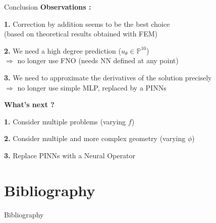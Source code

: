 \documentclass[compress,10pt,xcolor={table,dvipsnames},t]{beamer}
\newcommand{\refappendix}[1]{\tikz[baseline=(char.base)]{\node[framednumber] (char) {\hyperref[#1]{\small \textcolor{white}{Appendix \ref*{#1}}}};}}
\begin{document}
	\begin{frame}[label={lastslide}]{Conclusion}
		\textbf{Observations :}
		
		\textbf{1.} Correction by addition seems to be the best choice \\
		(based on theoretical results obtained with FEM)
		
		\textbf{2.} We need a high degree prediction ($u_\theta\in\mathbb{P}^{10}$) \\
		$\Rightarrow$ no longer use FNO (needs NN defined at any point)
		
		\textbf{3.} We need to approximate the derivatives of the solution precisely \\
		$\Rightarrow$ no longer use simple MLP, replaced by a PINNs
		
		\vspace{15pt}
		
		\textbf{What's next ?}
		
		\textbf{1.} Consider multiple problems (varying $f$)
		
		\textbf{2.} Consider multiple and more complex geometry (varying $\phi$)
		
		\textbf{3.} Replace PINNs with a Neural Operator  %
		
	\end{frame}
	
	\section{Bibliography}
	
	{ 
		\begin{frame}{Bibliography}
			\small
			\printbibliography[heading=none]
		\end{frame}
	}
	\addtocounter{framenumber}{-1} 
	
	\appendix
	
	
	
\end{document}
